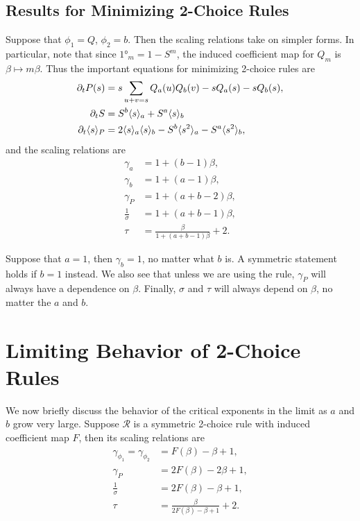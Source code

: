 \documentclass[twoside,10pt]{article}
\begin{document}
\subsection{Results for Minimizing 2-Choice Rules}

Suppose that $\phi_1 = Q$, $\phi_2 = b$. Then the scaling relations take on simpler forms. In particular, note that since $\ang{1}_{m} = 1 - S^{m}$, the induced coefficient map for $Q_m$ is $\beta \mapsto m \beta$. Thus the important equations for minimizing 2-choice rules are
\begin{align*}
        \partial_{t}{P(s)} &= s \sum_{u+v=s} Q_a(u) Q_b(v) - s Q_a(s) - s Q_b(s),\\
        \partial_{t}{S} &= S^{b}\langle s \rangle_{a} + S^{a}\langle s \rangle_{b}\\        \partial_{t}{\langle s \rangle_{P}} &= 2 \langle s \rangle_{a}\langle s \rangle_{b} - S^{b}\langle s^{2} \rangle_{a} - S^{a}\langle s^{2} \rangle_{b},
\end{align*}
and the scaling relations are
\begin{align*}
        \gamma_{a} &= 1 + (b-1)\beta,\\
        \gamma_{b} &= 1+(a-1)\beta,\\
        \gamma_{P} &= 1+(a+b-2)\beta,\\
        \frac{1}{\sigma} &= 1+(a+b-1)\beta,\\
        \tau &= \frac{\beta}{1+(a+b-1)\beta} +2.
\end{align*}

Suppose that $a=1$, then $\gamma_b=1$, no matter what $b$ is. A symmetric statement holds if $b=1$ instead. We also see that unless we are using the \ER rule, $\gamma_{P}$ will always have a dependence on $\beta$. Finally, $\sigma$ and $\tau$ will always depend on $\beta$, no matter the $a$ and $b$.

\section{Limiting Behavior of 2-Choice Rules}

We now briefly discuss the behavior of the critical exponents in the limit as $a$ and $b$ grow very large. Suppose $\mathcal{R}$ is a symmetric 2-choice rule with induced coefficient map $F$, then its scaling relations are
\begin{align*}
	\gamma_{\phi_1} = \gamma_{\phi_2} &= F(\beta)-\beta+1,\\
	\gamma_{P} &= 2F(\beta) - 2\beta+1,\\
	\frac{1}{\sigma}  &= 2F(\beta)-\beta+1,\\
	\tau &= \frac{\beta}{2F(\beta)-\beta+1} +2.
\end{align*}
\end{document}
